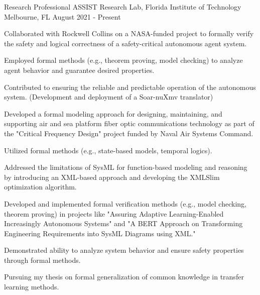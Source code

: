 


\begin{cventries}


\cventry
{Research Professional}
{ASSIST Research Lab, Florida Institute of Technology}
{Melbourne, FL}
{August 2021 - Present}
{
\begin{cvitems}
    \item Collaborated with Rockwell Collins on a NASA-funded project to formally verify the safety and logical correctness of a safety-critical autonomous agent system.
    \item Employed formal methods (e.g., theorem proving, model checking) to analyze agent behavior and guarantee desired properties.
    \item Contributed to ensuring the reliable and predictable operation of the autonomous system. (Development and deployment of a Soar-nuXmv translator)
    \item Developed a formal modeling approach for designing, maintaining, and supporting air and sea platform fiber optic communications technology as part of the "Critical Frequency Design" project funded by Naval Air Systems Command.
    \item Utilized formal methods (e.g., state-based models, temporal logics).
    \item Addressed the limitations of SysML for function-based modeling and reasoning by introducing an XML-based approach and developing the XMLSlim optimization algorithm.
    \item Developed and implemented formal verification methods (e.g., model checking, theorem proving) in projects like "Assuring Adaptive Learning-Enabled Increasingly Autonomous Systems" and "A BERT Approach on Transforming Engineering Requirements into SysML Diagrams using XML."
    \item Demonstrated ability to analyze system behavior and ensure safety properties through formal methods.
    \item Pursuing my thesis on formal generalization of common knowledge in transfer learning methods. 

\end{cvitems}}
\end{cventries}
